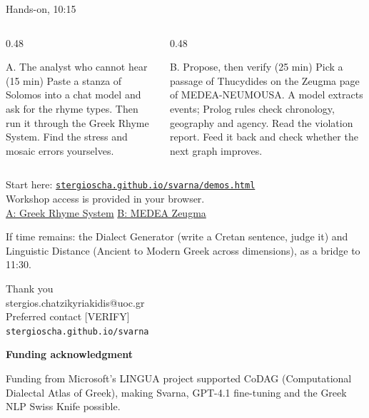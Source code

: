 \documentclass[aspectratio=169, 10pt]{beamer}
\begin{document}
\begin{frame}{Hands-on, 10:15}
  \small
  \begin{columns}[T]
    \begin{column}{0.48\textwidth}
      \begin{block}{A. The analyst who cannot hear (15 min)}
        Paste a stanza of Solomos into a chat model and ask for the rhyme types. Then run it through the Greek Rhyme System. Find the stress and mosaic errors yourselves.
      \end{block}
    \end{column}
    \begin{column}{0.48\textwidth}
      \begin{block}{B. Propose, then verify (25 min)}
        Pick a passage of Thucydides on the Zeugma page of MEDEA-NEUMOUSA. A model extracts events; Prolog rules check chronology, geography and agency. Read the violation report. Feed it back and check whether the next graph improves.
      \end{block}
    \end{column}
  \end{columns}
  \vspace{0.8em}
  \centering
  Start here: \href{https://stergioscha.github.io/svarna/demos.html}{\nolinkurl{stergioscha.github.io/svarna/demos.html}}\\[4pt]
  Workshop access is provided in your browser.\\[3pt]
  \footnotesize\href{https://greek-app-heaven-rhyme.livelyhill-85880e66.westeurope.azurecontainerapps.io}{A: Greek Rhyme System}
  \quad\href{https://greek-app-heaven-medea.livelyhill-85880e66.westeurope.azurecontainerapps.io/zeugma}{B: MEDEA Zeugma}
  \vspace{0.6em}
  \begin{flushleft}\footnotesize If time remains: the Dialect Generator (write a Cretan sentence, judge it) and Linguistic Distance (Ancient to Modern Greek across dimensions), as a bridge to 11:30.\end{flushleft}
\end{frame}

\begin{frame}[standout]
  Thank you\\[1em]
  {\normalsize\normalfont
  stergios.chatzikyriakidis@uoc.gr\\[2pt]
  {\scriptsize Preferred contact [VERIFY]}\\[4pt]
  \texttt{stergioscha.github.io/svarna}}\par\vspace{1em}
  {\small\normalfont
  \textbf{Funding acknowledgment}\par\vspace{5pt}
  \begin{minipage}{.92\textwidth}
    \centering Funding from Microsoft's LINGUA project supported CoDAG (Computational Dialectal Atlas of Greek), making Svarna, GPT-4.1 fine-tuning and the Greek NLP Swiss Knife possible.
  \end{minipage}}
\end{frame}
\end{document}
